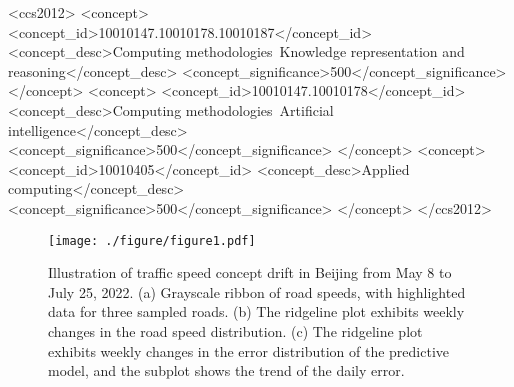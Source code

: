 \documentclass[sigconf]{acmart}
\begin{document}
\begin{CCSXML}
<ccs2012>
   <concept>
       <concept_id>10010147.10010178.10010187</concept_id>
       <concept_desc>Computing methodologies~Knowledge representation and reasoning</concept_desc>
       <concept_significance>500</concept_significance>
       </concept>
   <concept>
       <concept_id>10010147.10010178</concept_id>
       <concept_desc>Computing methodologies~Artificial intelligence</concept_desc>
       <concept_significance>500</concept_significance>
       </concept>
   <concept>
       <concept_id>10010405</concept_id>
       <concept_desc>Applied computing</concept_desc>
       <concept_significance>500</concept_significance>
       </concept>
 </ccs2012>
\end{CCSXML}



\maketitle

\begin{figure}[h]
	\centering
	\texttt{[image: ./figure/figure1.pdf]}
	\caption{Illustration of traffic speed concept drift in Beijing from May 8 to July 25, 2022. (a) Grayscale ribbon of road speeds, with highlighted data for three sampled roads. (b) The ridgeline plot exhibits weekly changes in the road speed distribution. (c) The ridgeline plot exhibits weekly changes in the error distribution of the predictive model, and the subplot shows the trend of the daily error.}
	\label{fig:concept_drift}
\end{figure}
\end{document}
